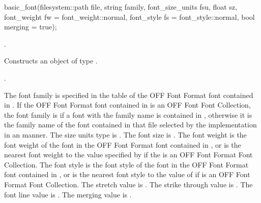 %
\begin{itemdecl}
basic_font(filesystem::path file, string family, font_size_units fsu, float sz, 
  font_weight fw = font_weight::normal, font_style fs = font_style::normal, 
  bool merging = true);
\end{itemdecl}
\begin{itemdescr}
\pnum
\requires {}.

\pnum
\effects Constructs an object of type .

\pnum
\postconditions {}.

\pnum
\remarks The font family is specified in the  table of the OFF Font Format font contained in . If the OFF Font Format font contained in  is an OFF Font Font Collection, the font family is  if a font with the family name  is contained in , otherwise it is the family name of the font contained in that file selected by the implementation in an \unspecnorm{} manner. The size units type is . The font size is . The font weight is the font weight of the font in the OFF Font Format font contained in , or is the nearest font weight to the value specified by  if the  is an OFF Font Format Font Collection. The font style is the font style of the font in the OFF Font Format font contained in , or is the nearest font style to the value of  if  is an OFF Font Format Font Collection. The stretch value is . The strike through value is . The font line value is . The merging value is .
\end{itemdescr}

